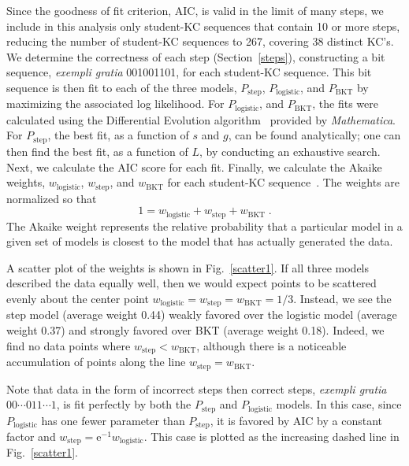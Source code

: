 \documentclass{edm_template}
\begin{document}
Since the goodness of fit criterion, AIC, is valid in the limit of
many steps, we include in this analysis only student-KC sequences that
contain 10 or more steps, reducing the number of student-KC sequences
to 267, covering 38 distinct KC's.  We determine the correctness of
each step (Section~\ref{steps}), constructing a bit sequence, {\em
exempli gratia} 001001101, for each student-KC sequence.  This bit
sequence is then fit to each of the three models, $P_\mathrm{step}$,
$P_\mathrm{logistic}$, and $P_\mathrm{BKT}$ by maximizing the
associated log likelihood.  
For $P_\mathrm{logistic}$, and $P_\mathrm{BKT}$, the fits were
calculated using the 
Differential Evolution algorithm~\cite{storn_differential_1997}
provided by {\em Mathematica}.
For $P_\mathrm{step}$, the best fit, as a function
of $s$ and $g$, can be found analytically; one can 
then find the best fit, as a function of $L$, 
by conducting an exhaustive search.
Next, we calculate the AIC score for each fit.  Finally,
we calculate the Akaike weights, $w_\mathrm{logistic}$,
$w_\mathrm{step}$, and $w_\mathrm{BKT}$ for each student-KC
sequence~\cite{burnham_model_2002}.
The weights are normalized so that
%
\begin{equation}
   1=w_\mathrm{logistic}+ w_\mathrm{step} + w_\mathrm{BKT} \; .
\end{equation}
%
The Akaike weight represents the relative probability that
a particular model in a given set of models is closest
to the model that has actually generated the data. 

A scatter plot of the weights is shown in Fig.~\ref{scatter1}.
If all three models described the data equally well, then
we would expect points to be scattered evenly about the  
center point $w_\mathrm{logistic}= w_\mathrm{step}= w_\mathrm{BKT}=1/3$.
Instead, we see the step model (average weight 0.44) weakly 
favored over the logistic model (average weight 0.37) and 
strongly favored over BKT (average weight 0.18).  Indeed, we 
find no data points where $w_\mathrm{step}< w_\mathrm{BKT}$,
although there is a noticeable accumulation of points along the line 
$w_\mathrm{step}= w_\mathrm{BKT}$.

Note that data in the form of incorrect steps then correct steps, 
{\it exempli gratia} $00\cdots 011\cdots 1$,
is fit perfectly by both the $P_\mathrm{step}$ and 
$P_\mathrm{logistic}$ models.  
In this case, since $P_\mathrm{logistic}$ has one fewer parameter
than $P_\mathrm{step}$, it is favored by AIC by a constant factor and
$w_\mathrm{step}=\mathrm{e}^{-1} w_\mathrm{logistic}$.  This case is
plotted as the increasing dashed line in Fig.~\ref{scatter1}.
\end{document}
